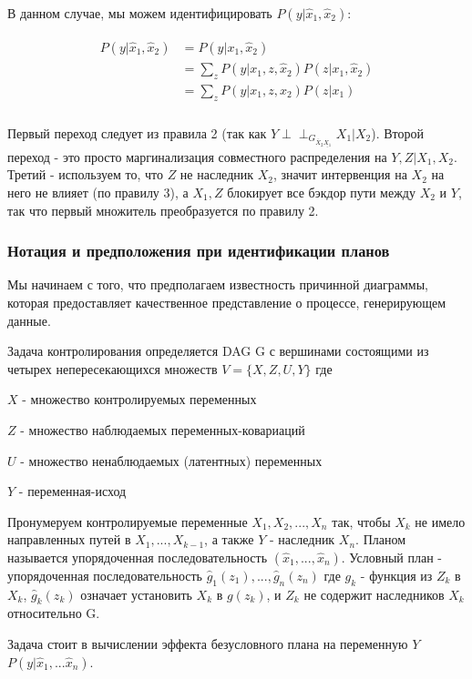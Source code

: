 \documentclass[fleqn]{article}
\newcommand{\independent}{\perp \!\!\! \perp}
\numberwithin{equation}{section}
\numberwithin{theorem}{section}
\numberwithin{figure}{section}
\numberwithin{lemma}{section}
\numberwithin{corollary}{section}
\begin{document}
В данном случае, мы можем идентифицировать $P(y | \hat x_1, \hat x_2)$:

\begin{align}
	\begin{split}
	P(y | \hat x_1, \hat x_2) &= P(y|x_1, \hat x_2) \\
	&= \sum\limits_{z} P(y|x_1,z, \hat x_2)P(z|x_1,\hat x_2)\\
	&= \sum\limits_{z} P(y|x_1,z, x_2)P(z|x_1)\\
	\end{split}
\end{align}

Первый переход следует из правила 2 (так как $Y \independent_{G_{\overline X_2 \underline{X_1}}} X_1 | X_2$). Второй переход - это просто маргинализация совместного распределения на $Y,Z | X_1, X_2$. Третий - используем то, что $Z$ не наследник $X_2$, значит интервенция на $X_2$ на него не влияет (по правилу 3), а $X_1, Z$ блокирует все бэкдор пути между $X_2$ и $Y$, так что первый множитель преобразуется по правилу 2. 

\subsubsection*{Нотация и предположения при идентификации планов}

Мы начинаем с того, что предполагаем известность причинной диаграммы, которая предоставляет качественное представление о процессе, генерирующем данные. 

Задача контролирования определяется DAG G с вершинами состоящими из четырех непересекающихся множеств $V = \{X,Z,U,Y\}$ где 

$X$ - множество контролируемых переменных 

$Z$ - множество наблюдаемых  переменных-ковариаций

$U$ - множество ненаблюдаемых (латентных) переменных

$Y$ - переменная-исход

Пронумеруем контролируемые переменные $X_1,X_2,...,X_n$ так, чтобы $X_k$ не имело направленных путей в $X_1,...,X_{k-1}$, а также $Y$ - наследник $X_n$. Планом называется упорядоченная последовательность $(\hat x_1, ..., \hat x_n)$. Условный план - упорядоченная последовательность $\hat g_1(z_1), ..., \hat g_n(z_n)$ где $g_k$ - функция из $Z_k$ в $X_k$, $\hat g_k(z_k)$ означает установить $X_k$ в $g(z_k)$, и $Z_k$ не содержит наследников $X_k$ относительно G.

Задача стоит в вычислении эффекта безусловного плана на переменную $Y$ $P(y|\hat x_1, ...\hat x_n)$. 
\end{document}
